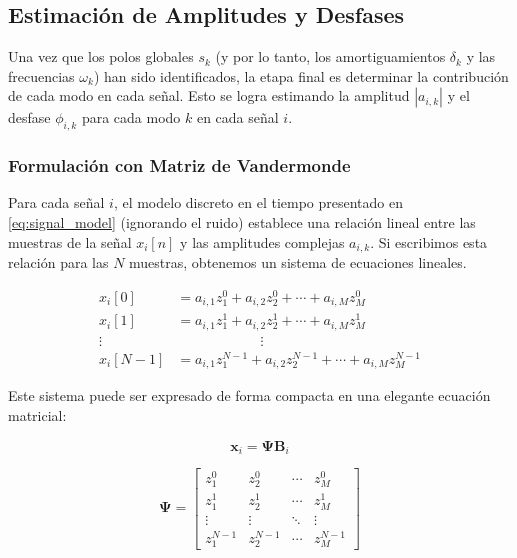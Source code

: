 \documentclass[conference]{IEEEtran}
\begin{document}
\subsection{Estimación de Amplitudes y Desfases}

Una vez que los polos globales $s_k$ (y por lo tanto, los amortiguamientos $\delta_k$ y las frecuencias $\omega_k$) han sido identificados, la etapa final es determinar la contribución de cada modo en cada señal. Esto se logra estimando la amplitud $|a_{i,k}|$ y el desfase $\phi_{i,k}$ para cada modo $k$ en cada señal $i$.

\subsubsection{Formulación con Matriz de Vandermonde}
Para cada señal $i$, el modelo discreto en el tiempo presentado en \eqref{eq:signal_model} (ignorando el ruido) establece una relación lineal entre las muestras de la señal $x_i[n]$ y las amplitudes complejas $a_{i,k}$. Si escribimos esta relación para las $N$ muestras, obtenemos un sistema de ecuaciones lineales.

\begin{align}
    x_i[0] &= a_{i,1}z_1^0 + a_{i,2}z_2^0 + \cdots + a_{i,M}z_M^0 \\
    x_i[1] &= a_{i,1}z_1^1 + a_{i,2}z_2^1 + \cdots + a_{i,M}z_M^1 \\
    \vdots & \qquad \qquad \qquad \vdots \nonumber \\
    x_i[N-1] &= a_{i,1}z_1^{N-1} + a_{i,2}z_2^{N-1} + \cdots + a_{i,M}z_M^{N-1}
\end{align}

Este sistema puede ser expresado de forma compacta en una elegante ecuación matricial:

\begin{equation}
\mathbf{x}_i = \mathbf{\Psi} \mathbf{B}_i
\label{eq:vandermonde_system}
\end{equation}

\begin{equation}
\mathbf{\Psi} =
\begin{bmatrix}
z_1^0 & z_2^0 & \cdots & z_M^0 \\
z_1^1 & z_2^1 & \cdots & z_M^1 \\
\vdots & \vdots & \ddots & \vdots \\
z_1^{N-1} & z_2^{N-1} & \cdots & z_M^{N-1}
\end{bmatrix}
\label{eq:vandermonde_matrix}
\end{equation}
\end{document}
